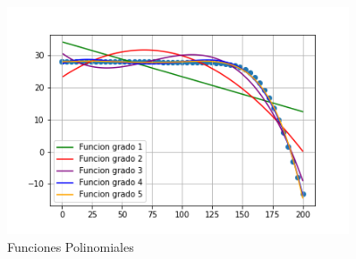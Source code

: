 \documentclass[a4paper,12pt]{article}
\begin{document}
\begin{itemize}
		

		\begin{figure}[htb]
			\centering
			\includegraphics[width=0.9\textwidth]{./imagenes/curvaajuste.png}
			\caption{Funciones Polinomiales}
		\end{figure} 
	
		
		
	\end{itemize}
	
	
	 
	
	 
	

	
	
	
	
	

	

	
\end{document}
